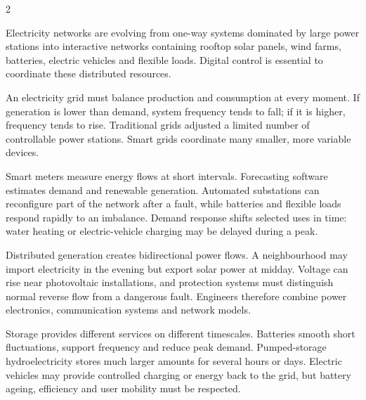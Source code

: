 

\begin{multicols}{2}
\begin{engineeringnews}
Electricity networks are evolving from one-way systems dominated by large power stations into
interactive networks containing rooftop solar panels, wind farms, batteries, electric vehicles and
flexible loads. Digital control is essential to coordinate these distributed resources.
\end{engineeringnews}

\begin{ecarticle}
An electricity grid must balance production and consumption at every moment. If generation is lower
than demand, system frequency tends to fall; if it is higher, frequency tends to rise. Traditional
grids adjusted a limited number of controllable power stations. Smart grids coordinate many smaller,
more variable devices.

Smart meters measure energy flows at short intervals. Forecasting software estimates demand and
renewable generation. Automated substations can reconfigure part of the network after a fault, while
batteries and flexible loads respond rapidly to an imbalance. Demand response shifts selected uses in
time: water heating or electric-vehicle charging may be delayed during a peak.

Distributed generation creates bidirectional power flows. A neighbourhood may import electricity in
the evening but export solar power at midday. Voltage can rise near photovoltaic installations, and
protection systems must distinguish normal reverse flow from a dangerous fault. Engineers therefore
combine power electronics, communication systems and network models.

Storage provides different services on different timescales. Batteries smooth short fluctuations,
support frequency and reduce peak demand. Pumped-storage hydroelectricity stores much larger amounts
for several hours or days. Electric vehicles may provide controlled charging or energy back to the
grid, but battery ageing, efficiency and user mobility must be respected.


\end{ecarticle}
\end{multicols}

